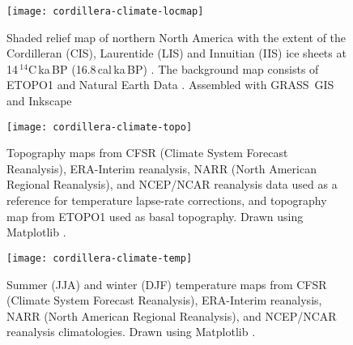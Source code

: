 
\begin{figure}[t]
	\vspace*{2mm}
	\begin{center}
		\texttt{[image: cordillera-climate-locmap]}
	\end{center}
	\caption{Shaded relief map of northern North America with the extent of the Cordilleran (CIS), Laurentide (LIS) and Innuitian (IIS) ice sheets at 14\,$^{14}$C\,ka\,BP (16.8\,cal\,ka\,BP) \citep{dyke-2004}. The background map consists of ETOPO1 \citep{data:etopo1} and Natural Earth Data \citep{data:naturalearth}. Assembled with GRASS~GIS \citep{soft:grass} and Inkscape \citep{web:inkscape}}
	\label{fig:locmap}
\end{figure}

\begin{figure*}[t]
	\vspace*{2mm}
	\begin{center}
		\texttt{[image: cordillera-climate-topo]}
	\end{center}
	\caption{Topography maps from CFSR (Climate System Forecast Reanalysis), ERA-Interim reanalysis, NARR (North American Regional Reanalysis), and NCEP/NCAR reanalysis data used as a reference for temperature lapse-rate corrections, and topography map from ETOPO1 used as basal topography. Drawn using Matplotlib \citep{soft:mpl}.}
	\label{fig:topo}
\end{figure*}

\begin{figure*}[t]
	\vspace*{2mm}
	\begin{center}
		\texttt{[image: cordillera-climate-temp]}
	\end{center}
	\caption{Summer (JJA) and winter (DJF) temperature maps from CFSR (Climate System Forecast Reanalysis), ERA-Interim reanalysis, NARR (North American Regional Reanalysis), and NCEP/NCAR reanalysis climatologies. Drawn using Matplotlib \citep{soft:mpl}.}
	\label{fig:temp}
\end{figure*}

